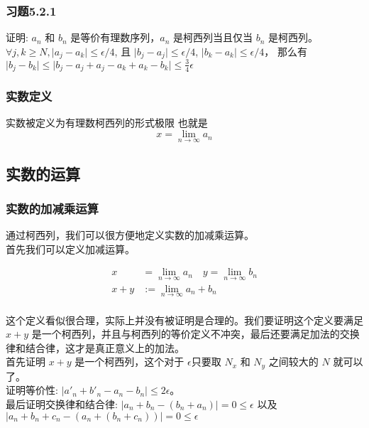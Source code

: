 \subsubsection{习题5.2.1}

证明: $a_n$ 和 $b_n$ 是等价有理数序列，$a_n$ 是柯西列当且仅当 $b_n$ 是柯西列。 \\

$\forall j, k \ge N, \lvert a_j - a_k \rvert \le \epsilon/4 $, 且 $ \lvert b_j - a_j \rvert \le \epsilon / 4 $, $\lvert b_k - a_k \rvert \le \epsilon / 4$， 那么有
$\lvert b_j - b_k \rvert \le \lvert  b_j - a_j + a_j - a_k + a_k - b_k \rvert \le \frac{3}{4} \epsilon $

\subsubsection{实数定义}

实数被定义为有理数柯西列的形式极限 也就是 
\[ x = \lim_{n \to \infty} a_n \]

\subsection{实数的运算}

\subsubsection{实数的加减乘运算}

通过柯西列，我们可以很方便地定义实数的加减乘运算。 \\
首先我们可以定义加减运算。

\begin{align*} 
x & = \lim_{n \to \infty}a_n \quad y  = \lim_{n \to \infty} b_n \\
x + y & := \lim_{n \to \infty} a_n + b_n 
\end{align*} \\

这个定义看似很合理，实际上并没有被证明是合理的。我们要证明这个定义要满足 $x +y $ 是一个柯西列，并且与柯西列的等价定义不冲突，最后还要满足加法的交换律和结合律，这才是真正意义上的加法。 \\
首先证明 $x +y $ 是一个柯西列，这个对于 $\epsilon $只要取 $N_x $ 和 $N_y$ 之间较大的 $N$ 就可以了。\\

证明等价性: $ \lvert a'_n + b'_n - a_n - b_n \rvert \le 2\epsilon $。\\

最后证明交换律和结合律: $ \lvert a_n + b_n - (b_n + a_n) \rvert = 0 \le \epsilon $ 以及 $ \lvert a_n + b_n + c_n - (a_n + (b_n + c_n)) \rvert = 0 \le \epsilon $ \\

